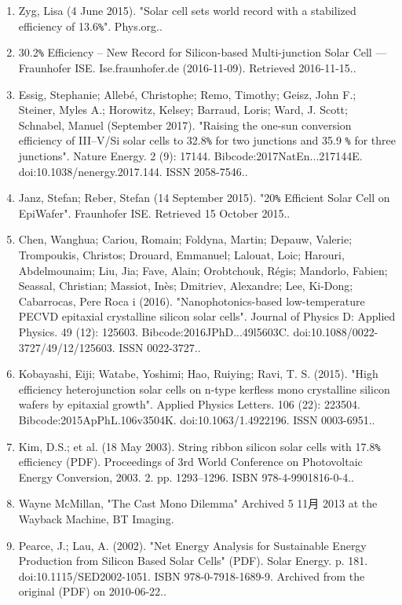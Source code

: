 \begin{enumerate}
\item Zyg, Lisa (4 June 2015). "Solar cell sets world record with a stabilized efficiency of 13.6\verb|%|". Phys.org..
\item 30.2\verb|%| Efficiency – New Record for Silicon-based Multi-junction Solar Cell — Fraunhofer ISE. Ise.fraunhofer.de (2016-11-09). Retrieved 2016-11-15..
\item Essig, Stephanie; Allebé, Christophe; Remo, Timothy; Geisz, John F.; Steiner, Myles A.; Horowitz, Kelsey; Barraud, Loris; Ward, J. Scott; Schnabel, Manuel (September 2017). "Raising the one-sun conversion efficiency of III–V/Si solar cells to 32.8\verb|%| for two junctions and 35.9 \verb|%| for three junctions". Nature Energy. 2 (9): 17144. Bibcode:2017NatEn...217144E. doi:10.1038/nenergy.2017.144. ISSN 2058-7546..
\item Janz, Stefan; Reber, Stefan (14 September 2015). "20\verb|%| Efficient Solar Cell on EpiWafer". Fraunhofer ISE. Retrieved 15 October 2015..
\item Chen, Wanghua; Cariou, Romain; Foldyna, Martin; Depauw, Valerie; Trompoukis, Christos; Drouard, Emmanuel; Lalouat, Loic; Harouri, Abdelmounaim; Liu, Jia; Fave, Alain; Orobtchouk, Régis; Mandorlo, Fabien; Seassal, Christian; Massiot, Inès; Dmitriev, Alexandre; Lee, Ki-Dong; Cabarrocas, Pere Roca i (2016). "Nanophotonics-based low-temperature PECVD epitaxial crystalline silicon solar cells". Journal of Physics D: Applied Physics. 49 (12): 125603. Bibcode:2016JPhD...49l5603C. doi:10.1088/0022-3727/49/12/125603. ISSN 0022-3727..
\item Kobayashi, Eiji; Watabe, Yoshimi; Hao, Ruiying; Ravi, T. S. (2015). "High efficiency heterojunction solar cells on n-type kerfless mono crystalline silicon wafers by epitaxial growth". Applied Physics Letters. 106 (22): 223504. Bibcode:2015ApPhL.106v3504K. doi:10.1063/1.4922196. ISSN 0003-6951..
\item Kim, D.S.; et al. (18 May 2003). String ribbon silicon solar cells with 17.8\verb|%| efficiency (PDF). Proceedings of 3rd World Conference on Photovoltaic Energy Conversion, 2003. 2. pp. 1293–1296. ISBN 978-4-9901816-0-4..
\item Wayne McMillan, "The Cast Mono Dilemma" Archived 5 11月 2013 at the Wayback Machine, BT Imaging.
\item Pearce, J.; Lau, A. (2002). "Net Energy Analysis for Sustainable Energy Production from Silicon Based Solar Cells" (PDF). Solar Energy. p. 181. doi:10.1115/SED2002-1051. ISBN 978-0-7918-1689-9. Archived from the original (PDF) on 2010-06-22..

\end{enumerate}
